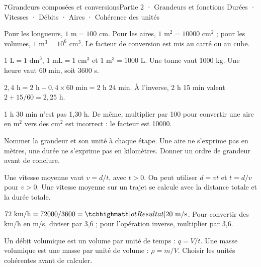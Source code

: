 \begin{ouverture}[courbe]{7}{Grandeurs composées et conversions}{Partie 2 · Grandeurs et fonctions}
{Durées · Vitesses · Débits · Aires · Cohérence des unités}
\end{ouverture}
\pagestyle{otMain}\essentiel\fontsize{11}{15}\selectfont
{}
\begin{propriete}Pour les longueurs, $1\text{ m}=100\text{ cm}$. Pour les aires, $1\text{ m}^2=10000\text{ cm}^2$ ; pour les volumes, $1\text{ m}^3=10^6\text{ cm}^3$. Le facteur de conversion est mis au carré ou au cube.\end{propriete}
\begin{propriete}$1\text{ L}=1\text{ dm}^3$, $1\text{ mL}=1\text{ cm}^3$ et $1\text{ m}^3=1000\text{ L}$. Une tonne vaut 1000 kg. Une heure vaut 60 min, soit 3600 s.\end{propriete}
\begin{exemple}$2{,}4\text{ h}=2\text{ h}+0{,}4\times60\text{ min}=2\text{ h }24\text{ min}$. À l’inverse, 2 h 15 min valent $2+15/60=2{,}25$ h.\end{exemple}
\begin{attention}1 h 30 min n’est pas 1,30 h. De même, multiplier par 100 pour convertir une aire en m$^2$ vers des cm$^2$ est incorrect : le facteur est 10000.\end{attention}
\begin{savoirfaire}Nommer la grandeur et son unité à chaque étape. Une aire ne s’exprime pas en mètres, une durée ne s’exprime pas en kilomètres. Donner un ordre de grandeur avant de conclure.\end{savoirfaire}
\clearpage
{}
\begin{propriete}Une vitesse moyenne vaut $v=d/t$, avec $t>0$. On peut utiliser $d=vt$ et $t=d/v$ pour $v>0$. Une vitesse moyenne sur un trajet se calcule avec la distance totale et la durée totale.\end{propriete}
\begin{exemple}$72\text{ km/h}=72000/3600=\res{20\text{ m/s}}$. Pour convertir des km/h en m/s, diviser par 3,6 ; pour l’opération inverse, multiplier par 3,6.\end{exemple}
\begin{definition}Un débit volumique est un volume par unité de temps : $q=V/t$. Une masse volumique est une masse par unité de volume : $\rho=m/V$. Choisir les unités cohérentes avant de calculer.\end{definition}

